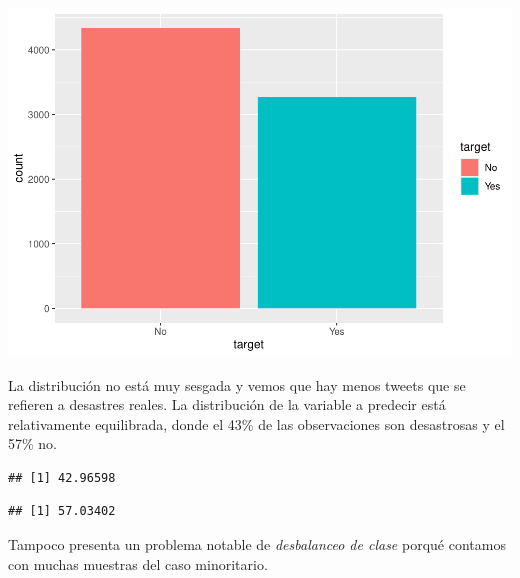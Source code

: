 \documentclass[
]{article}
\newenvironment{Shaded}{\begin{snugshade}}{\end{snugshade}}
\newcommand{\DecValTok}[1]{\textcolor[rgb]{0.00,0.00,0.81}{#1}}
\newcommand{\KeywordTok}[1]{\textcolor[rgb]{0.13,0.29,0.53}{\textbf{#1}}}
\newcommand{\NormalTok}[1]{#1}
\newcommand{\OperatorTok}[1]{\textcolor[rgb]{0.81,0.36,0.00}{\textbf{#1}}}
\newcommand{\StringTok}[1]{\textcolor[rgb]{0.31,0.60,0.02}{#1}}
\begin{document}
\begin{center}\includegraphics[width=0.7\linewidth]{document_files/figure-latex/unnamed-chunk-6-1} \end{center}

La distribución no está muy sesgada y vemos que hay menos tweets que se
refieren a desastres reales. La distribución de la variable a predecir
está relativamente equilibrada, donde el 43\% de las observaciones son
desastrosas y el 57\% no.

\begin{Shaded}
\end{Shaded}

\begin{verbatim}
## [1] 42.96598
\end{verbatim}

\begin{Shaded}
\end{Shaded}

\begin{verbatim}
## [1] 57.03402
\end{verbatim}

Tampoco presenta un problema notable de \emph{desbalanceo de clase}
porqué contamos con muchas muestras del caso minoritario.
\end{document}

